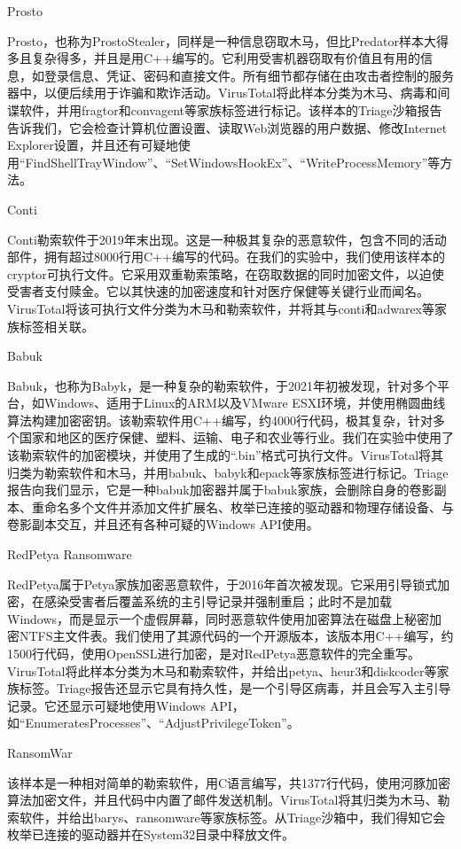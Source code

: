 Prosto

Prosto，也称为ProstoStealer，同样是一种信息窃取木马，但比Predator样本大得多且复杂得多，并且是用C++编写的。它利用受害机器窃取有价值且有用的信息，如登录信息、凭证、密码和直接文件。所有细节都存储在由攻击者控制的服务器中，以便后续用于诈骗和欺诈活动\parencite{Spyware2020}。VirusTotal将此样本分类为木马、病毒和间谍软件，并用fragtor和convagent等家族标签进行标记。该样本的Triage沙箱报告告诉我们，它会检查计算机位置设置、读取Web浏览器的用户数据、修改Internet Explorer设置，并且还有可疑地使用“FindShellTrayWindow”、“SetWindowsHookEx”、“WriteProcessMemory”等方法。

Conti

Conti勒索软件于2019年末出现\parencite{Wikipedia2019Conti}。这是一种极其复杂的恶意软件，包含不同的活动部件，拥有超过8000行用C++编写的代码。在我们的实验中，我们使用该样本的cryptor可执行文件。它采用双重勒索策略，在窃取数据的同时加密文件，以迫使受害者支付赎金。它以其快速的加密速度和针对医疗保健等关键行业而闻名\parencite{Wikipedia2019Conti}。VirusTotal将该可执行文件分类为木马和勒索软件，并将其与conti和adwarex等家族标签相关联。

Babuk

Babuk，也称为Babyk，是一种复杂的勒索软件，于2021年初被发现\parencite{McAfee2019}，针对多个平台，如Windows、适用于Linux的ARM以及VMware ESXI环境，并使用椭圆曲线算法构建加密密钥\parencite{Fraunhofer2021}。该勒索软件用C++编写，约4000行代码，极其复杂，针对多个国家和地区的医疗保健、塑料、运输、电子和农业等行业\parencite{McAfee2019}。我们在实验中使用了该勒索软件的加密模块，并使用了生成的“.bin”格式可执行文件。VirusTotal将其归类为勒索软件和木马，并用babuk、babyk和epack等家族标签进行标记。Triage报告向我们显示，它是一种babuk加密器并属于babuk家族，会删除自身的卷影副本、重命名多个文件并添加文件扩展名、枚举已连接的驱动器和物理存储设备、与卷影副本交互，并且还有各种可疑的Windows API使用。

RedPetya Ransomware

RedPetya属于Petya家族加密恶意软件，于2016年首次被发现\parencite{Wikipedia2016Petya}。它采用引导锁式加密，在感染受害者后覆盖系统的主引导记录并强制重启；此时不是加载Windows，而是显示一个虚假屏幕，同时恶意软件使用加密算法在磁盘上秘密加密NTFS主文件表\parencite{MalwareBytes2016}。我们使用了其源代码的一个开源版本，该版本用C++编写，约1500行代码，使用OpenSSL进行加密，是对RedPetya恶意软件的完全重写。VirusTotal将此样本分类为木马和勒索软件，并给出petya、heur3和diskcoder等家族标签。Triage报告还显示它具有持久性，是一个引导区病毒，并且会写入主引导记录。它还显示可疑地使用Windows API，如“EnumeratesProcesses”、“AdjustPrivilegeToken”。

RansomWar

该样本是一种相对简单的勒索软件，用C语言编写，共1377行代码，使用河豚加密算法加密文件，并且代码中内置了邮件发送机制。VirusTotal将其归类为木马、勒索软件，并给出barys、ransomware等家族标签。从Triage沙箱中，我们得知它会枚举已连接的驱动器并在System32目录中释放文件。


